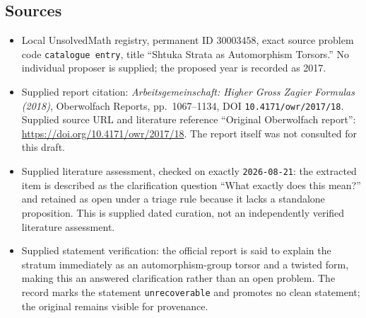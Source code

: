 \documentclass[11pt]{article}
\begin{document}
\subsection{Sources}
\begin{itemize}
\item Local UnsolvedMath registry, permanent ID \(30003458\), exact source problem code \texttt{catalogue entry}, title ``Shtuka Strata as Automorphism Torsors.'' No individual proposer is supplied; the proposed year is recorded as 2017.
\item Supplied report citation: \emph{Arbeitsgemeinschaft: Higher Gross Zagier Formulas (2018)}, Oberwolfach Reports, pp.~1067--1134, DOI \texttt{10.4171/owr/2017/18}. Supplied source URL and literature reference ``Original Oberwolfach report'': \url{https://doi.org/10.4171/owr/2017/18}. The report itself was not consulted for this draft.
\item Supplied literature assessment, checked on exactly \texttt{2026-08-21}: the extracted item is described as the clarification question ``What exactly does this mean?'' and retained as open under a triage rule because it lacks a standalone proposition. This is supplied dated curation, not an independently verified literature assessment.
\item Supplied statement verification: the official report is said to explain the stratum immediately as an automorphism-group torsor and a twisted form, making this an answered clarification rather than an open problem. The record marks the statement \texttt{unrecoverable} and promotes no clean statement; the original remains visible for provenance.
\end{itemize}
\end{document}
